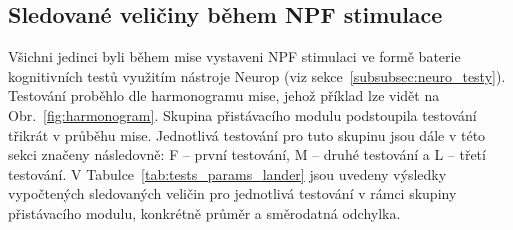 \subsection{Sledované veličiny během NPF stimulace}
\label{sec:result_cog_tests}
Všichni jedinci byli během mise vystaveni \gls{NPF} stimulaci ve formě baterie
kognitivních testů využitím nástroje Neurop (viz
sekce~\ref{subsubsec:neuro_testy}). Testování proběhlo dle harmonogramu mise, 
jehož příklad lze vidět na Obr.~\ref{fig:harmonogram}. Skupina přistávacího
modulu podstoupila testování třikrát v průběhu mise. Jednotlivá testování pro
tuto skupinu jsou dále v této sekci značeny následovně: F -- první testování, M
-- druhé testování a L -- třetí testování. V
Tabulce~\ref{tab:tests_params_lander} jsou uvedeny výsledky vypočtených
sledovaných veličin pro jednotlivá testování v rámci skupiny přistávacího
modulu, konkrétně průměr a směrodatná odchylka.

